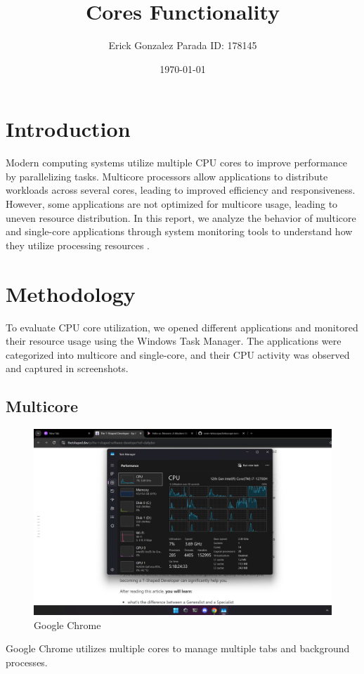 \documentclass{article}
\title{Cores Functionality}
\author{Erick Gonzalez Parada ID: 178145}
\date{\today}
\begin{document}
\maketitle

\section{Introduction}
Modern computing systems utilize multiple CPU cores to improve performance by parallelizing tasks. Multicore processors allow applications to distribute workloads across several cores, leading to improved efficiency and responsiveness. However, some applications are not optimized for multicore usage, leading to uneven resource distribution. In this report, we analyze the behavior of multicore and single-core applications through system monitoring tools to understand how they utilize processing resources \cite{theWindowsClub}.

\section{Methodology}
To evaluate CPU core utilization, we opened different applications and monitored their resource usage using the Windows Task Manager. The applications were categorized into multicore and single-core, and their CPU activity was observed and captured in screenshots.

\subsection*{Multicore}

\begin{figure}[H]
\centering
\includegraphics[width=1\textwidth]{imgs/mu1.png}
\caption{Google Chrome}
\label{fig:1}
\end{figure}
Google Chrome utilizes multiple cores to manage multiple tabs and background processes.
\end{document}
